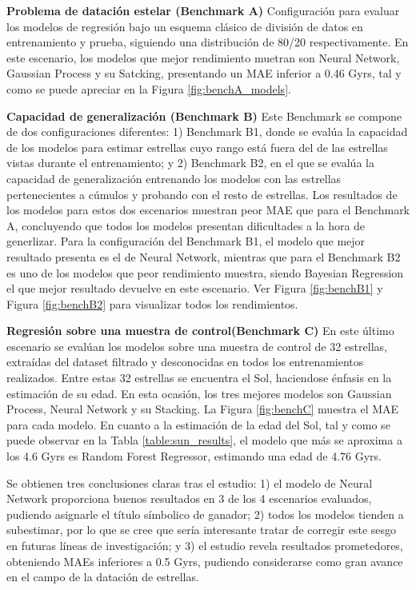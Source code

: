 \textbf{Problema de datación estelar (Benchmark A)} {} Configuración para evaluar los modelos de regresión bajo un esquema clásico de división de datos en entrenamiento y prueba, siguiendo una distribución de 80/20 respectivamente. En este escenario, los modelos que mejor rendimiento muetran son Neural Network, Gaussian Process y su Satcking, presentando un MAE inferior a 0.46 Gyrs, tal y como se puede apreciar en la Figura \ref{fig:benchA_models}.

\vspace{0.25cm}

\textbf{Capacidad de generalización (Benchmark B)} {} Este Benchmark se compone de dos configuraciones diferentes: 1) Benchmark B1, donde se evalúa la capacidad de los modelos para estimar estrellas cuyo rango está fuera del de las estrellas vistas durante el entrenamiento; y 2) Benchmark B2, en el que se evalúa la capacidad de generalización entrenando los modelos con las estrellas pertenecientes a cúmulos y probando con el resto de estrellas. Los resultados de los modelos para estos dos escenarios muestran peor MAE que para el Benchmark A, concluyendo que todos los modelos presentan dificultades a la hora de generlizar. Para la configuración del Benchmark B1, el modelo que mejor resultado presenta es el de Neural Network, mientras que para el Benchmark B2 es uno de los modelos que peor rendimiento muestra, siendo Bayesian Regression el que mejor resultado devuelve en este escenario. Ver Figura \ref{fig:benchB1} y Figura \ref{fig:benchB2} para visualizar todos los rendimientos.

\vspace{0.25cm}

\textbf{Regresión sobre una muestra de control(Benchmark C)} {}  En este último escenario se evalúan los modelos sobre una muestra de control de 32 estrellas, extraídas del dataset filtrado y desconocidas en todos los entrenamientos realizados. Entre estas 32 estrellas se encuentra el Sol, haciendose énfasis en la estimación de su edad. En esta ocasión, los tres mejores modelos son Gaussian Process, Neural Network y su Stacking. La Figura \ref{fig:benchC} muestra el MAE para cada modelo. En cuanto a la estimación de la edad del Sol, tal y como se puede observar en la Tabla \ref{table:sun_results}, el modelo que más se aproxima a los 4.6 Gyrs es Random Forest Regressor, estimando una edad de 4.76 Gyrs.

\vspace{0.5cm}

Se obtienen tres conclusiones claras tras el estudio: 1) el modelo de Neural Network proporciona buenos resultados en 3 de los 4 escenarios evaluados, pudiendo asignarle el título símbolico de ganador; 2) todos los modelos tienden a subestimar, por lo que se cree que sería interesante tratar de corregir este sesgo en futuras líneas de investigación; y 3) el estudio revela resultados prometedores, obteniendo MAEs inferiores a 0.5 Gyrs, pudiendo considerarse como gran avance en el campo de la datación de estrellas.




